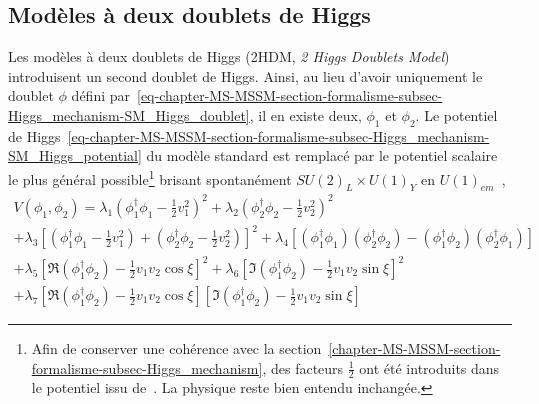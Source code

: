 \subsection{Modèles à deux doublets de Higgs}\label{chapter-MS-MSSM-section-BSM-subsec-dbl_H_dbl}
\par Les modèles à deux doublets de Higgs (2HDM, \emph{2 Higgs Doublets Model}) introduisent un second doublet de Higgs.
Ainsi, au lieu d'avoir uniquement le doublet $\phi$ défini par~\eqref{eq-chapter-MS-MSSM-section-formalisme-subsec-Higgs_mechanism-SM_Higgs_doublet}, il en existe deux, $\phi_1$ et $\phi_2$.
Le potentiel de Higgs~\eqref{eq-chapter-MS-MSSM-section-formalisme-subsec-Higgs_mechanism-SM_Higgs_potential} du modèle standard est remplacé par le potentiel scalaire le plus général possible\footnote{Afin de conserver une cohérence avec la section~\ref{chapter-MS-MSSM-section-formalisme-subsec-Higgs_mechanism}, des facteurs $\tfrac{1}{2}$ ont été introduits dans le potentiel issu de~\cite{Higgs_hunter_guide,Higgs_hunter_guide_errata}. La physique reste bien entendu inchangée.} brisant spontanément $SU(2)_L \times U(1)_Y$ en $U(1)_{em}$~\cite{Higgs_hunter_guide,Higgs_hunter_guide_errata},
\begin{multline}
V(\phi_1,\phi_2)
= \lambda_1 (\phi_1^\dagger\phi_1 - \tfrac{1}{2} v_1^2)^2
+ \lambda_2 (\phi_2^\dagger\phi_2 - \tfrac{1}{2} v_2^2)^2
\\
+ \lambda_3 \left[ (\phi_1^\dagger\phi_1 - \tfrac{1}{2} v_1^2) + (\phi_2^\dagger\phi_2 - \tfrac{1}{2} v_2^2) \right]^2
+ \lambda_4 \left[ (\phi_1^\dagger\phi_1)(\phi_2^\dagger\phi_2) - (\phi_1^\dagger\phi_2)(\phi_2^\dagger\phi_1) \right]
\\
+ \lambda_5 \left[ \Re(\phi_1^\dagger\phi_2) - \tfrac{1}{2} v_1v_2\cos\xi \right]^2
+ \lambda_6 \left[ \Im(\phi_1^\dagger\phi_2) - \tfrac{1}{2} v_1v_2\sin\xi \right]^2
\\
+ \lambda_7 \left[ \Re(\phi_1^\dagger\phi_2) - \tfrac{1}{2} v_1v_2\cos\xi \right]\left[ \Im(\phi_1^\dagger\phi_2) - \tfrac{1}{2} v_1v_2\sin\xi \right]
\label{eq-chapter-MS-MSSM-section-BSM-subsec-dbl_H_dbl-Higgs_potential}
\end{multline}

